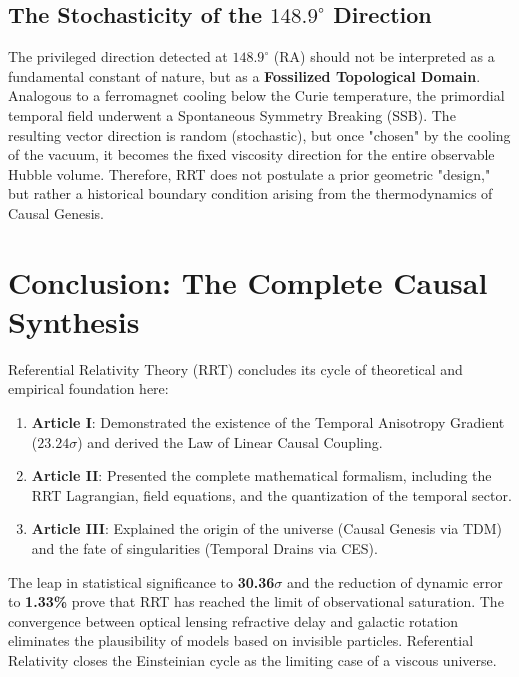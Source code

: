 \documentclass[12pt, a4paper]{article}
\begin{document}
\subsection{The Stochasticity of the \texorpdfstring{$148.9^\circ$}{148.9 degrees} Direction}

The privileged direction detected at $148.9^\circ$ (RA) should not be interpreted as a fundamental constant of nature, but as a \textbf{Fossilized Topological Domain}.
Analogous to a ferromagnet cooling below the Curie temperature, the primordial temporal field underwent a Spontaneous Symmetry Breaking (SSB). The resulting vector direction is random (stochastic), but once "chosen" by the cooling of the vacuum, it becomes the fixed viscosity direction for the entire observable Hubble volume.
Therefore, RRT does not postulate a prior geometric "design," but rather a historical boundary condition arising from the thermodynamics of Causal Genesis.

\section{Conclusion: The Complete Causal Synthesis}

Referential Relativity Theory (RRT) concludes its cycle of theoretical and empirical foundation here:

\begin{enumerate}
    \item \textbf{Article I}: Demonstrated the existence of the Temporal Anisotropy Gradient (\(23.24\sigma\)) and derived the Law of Linear Causal Coupling.
    \item \textbf{Article II}: Presented the complete mathematical formalism, including the RRT Lagrangian, field equations, and the quantization of the temporal sector.
    \item \textbf{Article III}: Explained the origin of the universe (Causal Genesis via TDM) and the fate of singularities (Temporal Drains via CES).
\end{enumerate}

The leap in statistical significance to \textbf{30.36$\sigma$} and the reduction of dynamic error to \textbf{1.33\%} prove that RRT has reached the limit of observational saturation. The convergence between optical lensing refractive delay and galactic rotation eliminates the plausibility of models based on invisible particles. Referential Relativity closes the Einsteinian cycle as the limiting case of a viscous universe.
\newpage
\end{document}
